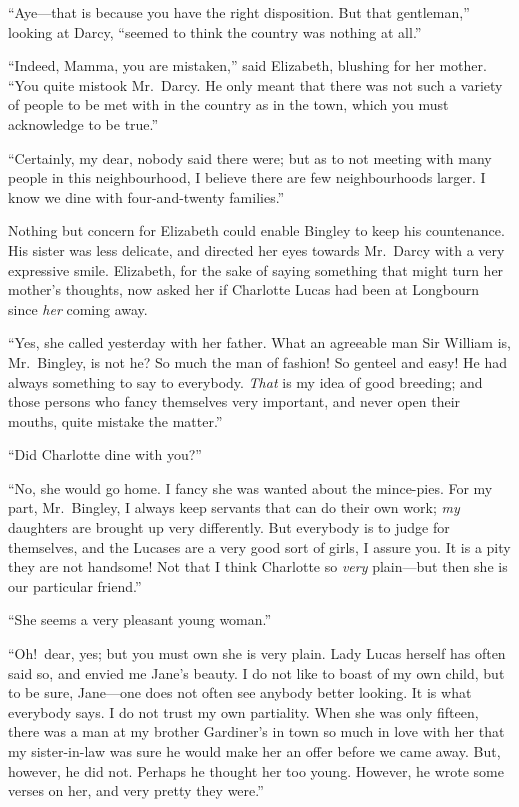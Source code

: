 \documentclass[12pt,english,oneside]{book}
\begin{document}
{}``Aye\mbox{---}that is because you have the right disposition.
But that gentleman,'' looking at Darcy, {}``seemed to think the
country was nothing at all.''

{}``Indeed, Mamma, you are mistaken,'' said Elizabeth, blushing
for her mother. {}``You quite mistook Mr.\ Darcy. He only meant
that there was not such a variety of people to be met with in the
country as in the town, which you must acknowledge to be true.''

{}``Certainly, my dear, nobody said there were; but as to not meeting
with many people in this neighbourhood, I believe there are few neighbourhoods
larger. I know we dine with four-and-twenty families.''

Nothing but concern for Elizabeth could enable Bingley to keep his
countenance. His sister was less delicate, and directed her eyes towards
Mr.\ Darcy with a very expressive smile. Elizabeth, for the sake
of saying something that might turn her mother's thoughts, now asked
her if Charlotte Lucas had been at Longbourn since \textit{her} coming
away.

{}``Yes, she called yesterday with her father. What an agreeable
man Sir William is, Mr.\ Bingley, is not he? So much the man of fashion!
So genteel and easy! He had always something to say to everybody.
\textit{That} is my idea of good breeding; and those persons who fancy
themselves very important, and never open their mouths, quite mistake
the matter.''

{}``Did Charlotte dine with you?''\ 

{}``No, she would go home. I fancy she was wanted about the mince-pies.
For my part, Mr.\ Bingley, I always keep servants that can do their
own work; \textit{my} daughters are brought up very differently. But
everybody is to judge for themselves, and the Lucases are a very good
sort of girls, I assure you. It is a pity they are not handsome! Not
that I think Charlotte so \textit{very} plain\mbox{---}but then she
is our particular friend.''

{}``She seems a very pleasant young woman.''

{}``Oh!\ dear, yes; but you must own she is very plain. Lady Lucas
herself has often said so, and envied me Jane's beauty. I do not like
to boast of my own child, but to be sure, Jane\mbox{---}one does
not often see anybody better looking. It is what everybody says. I
do not trust my own partiality. When she was only fifteen, there was
a man at my brother Gardiner's in town so much in love with her that
my sister-in-law was sure he would make her an offer before we came
away. But, however, he did not. Perhaps he thought her too young.
However, he wrote some verses on her, and very pretty they were.''
\end{document}
